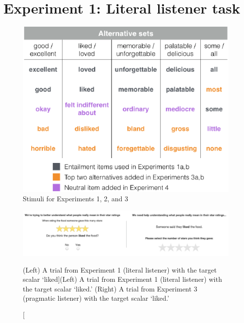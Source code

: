 \documentclass[10pt, letterpaper]{article}
\newenvironment{CodeChunk}{}{}
\begin{document}
\section{Experiment 1: Literal listener
task}\label{experiment-1-literal-listener-task}

\begin{CodeChunk}
\begin{figure}[t]
\includegraphics{figs/allScalesTable-1} \caption[Stimuli for Experiments 1, 2, and 3]{Stimuli for Experiments 1, 2, and 3}\label{fig:allScalesTable}
\end{figure}
\end{CodeChunk}

\begin{CodeChunk}
\begin{figure}[t]

{\centering \includegraphics{figs/stimuli_exp1-1} 

}

\caption[(Left) A trial from Experiment 1 (literal listener) with the target scalar `liked]{(Left) A trial from Experiment 1 (literal listener) with the target scalar `liked.' (Right) A trial from Experiment 3 (pragmatic listener) with the target scalar `liked.'}\label{fig:stimuli_exp1}
\end{figure}
\end{CodeChunk}
\end{document}
